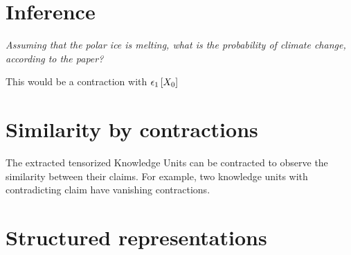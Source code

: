 \documentclass[aps,onecolumn,nofootinbib,pra]{article}
\begin{document}
    \section{Inference}


    \begin{center}
        \textit{
            Assuming that the polar ice is melting, what is the probability of climate change, according to the paper?
        }
    \end{center}

    This would be a contraction with $\epsilon_{1}\left[X_{0}\right]$



    \section{Similarity by contractions}

    The extracted tensorized Knowledge Units can be contracted to observe the similarity between their claims.
    For example, two knowledge units with contradicting claim have vanishing contractions.

%


    \section{Structured representations}
\end{document}
